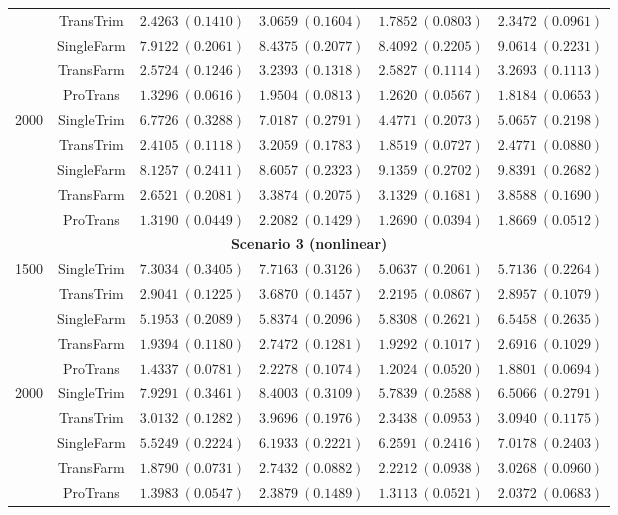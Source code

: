 \documentclass[12pt]{article}
\begin{document}
\begin{table}[!ht]
\begin{tabular}{cccccc}
& TransTrim   & $2.4263\ (0.1410)$ & $3.0659\ (0.1604)$ & $1.7852\ (0.0803)$ & $2.3472\ (0.0961)$ \\
& SingleFarm  & $7.9122\ (0.2061)$ & $8.4375\ (0.2077)$ & $8.4092\ (0.2205)$ & $9.0614\ (0.2231)$ \\
& TransFarm   & $2.5724\ (0.1246)$ & $3.2393\ (0.1318)$ & $2.5827\ (0.1114)$ & $3.2693\ (0.1113)$ \\
& ProTrans    & $\bm{1.3296}\ (0.0616)$ & $\bm{1.9504}\ (0.0813)$ & $\bm{1.2620}\ (0.0567)$ & $\bm{1.8184}\ (0.0653)$ \\
\hline
\multirow{5}{*}{2000}
& SingleTrim  & $6.7726\ (0.3288)$ & $7.0187\ (0.2791)$ & $4.4771\ (0.2073)$ & $5.0657\ (0.2198)$ \\
& TransTrim   & $2.4105\ (0.1118)$ & $3.2059\ (0.1783)$ & $1.8519\ (0.0727)$ & $2.4771\ (0.0880)$ \\
& SingleFarm  & $8.1257\ (0.2411)$ & $8.6057\ (0.2323)$ & $9.1359\ (0.2702)$ & $9.8391\ (0.2682)$ \\
& TransFarm   & $2.6521\ (0.2081)$ & $3.3874\ (0.2075)$ & $3.1329\ (0.1681)$ & $3.8588\ (0.1690)$ \\
& ProTrans    & $\bm{1.3190}\ (0.0449)$ & $\bm{2.2082}\ (0.1429)$ & $\bm{1.2690}\ (0.0394)$ & $\bm{1.8669}\ (0.0512)$ \\
        \hline
         \multicolumn{6}{c}{\textbf{Scenario 3 (nonlinear)}}\\
        \hline
        \multirow{5}{*}{1500}
& SingleTrim  & $7.3034\ (0.3405)$& $7.7163\ (0.3126)$& $5.0637\ (0.2061)$  & $5.7136\ (0.2264)$\\
& TransTrim   & $2.9041\ (0.1225)$  & $3.6870\ (0.1457)$ & $2.2195\ (0.0867)$  & $2.8957\ (0.1079)$  \\
& SingleFarm  & $5.1953\ (0.2089)$ & $5.8374\ (0.2096)$ & $5.8308\ (0.2621)$ & $6.5458\ (0.2635)$ \\
& TransFarm   & $1.9394\ (0.1180)$  & $2.7472\ (0.1281)$  & $1.9292\ (0.1017)$  & $2.6916\ (0.1029)$ \\
& ProTrans    & $\bm{1.4337}\ (0.0781)$ & $\bm{2.2278}\ (0.1074)$ & $\bm{1.2024}\ (0.0520)$  & $\bm{1.8801}\ (0.0694)$ \\
\hline
\multirow{5}{*}{2000}
& SingleTrim  & $7.9291\ (0.3461)$  & $8.4003\ (0.3109)$  & $5.7839\ (0.2588)$  & $6.5066\ (0.2791)$ \\
& TransTrim   & $3.0132\ (0.1282)$  & $3.9696\ (0.1976)$& $2.3438\ (0.0953)$ & $3.0940\ (0.1175)$  \\
& SingleFarm  & $5.5249\ (0.2224)$ & $6.1933\ (0.2221)$  & $6.2591\ (0.2416)$  & $7.0178\ (0.2403)$  \\
& TransFarm   & $1.8790\ (0.0731)$ & $2.7432\ (0.0882)$  & $2.2212\ (0.0938)$  & $3.0268\ (0.0960)$\\
& ProTrans    & $\bm{1.3983}\ (0.0547)$ & $\bm{2.3879}\ (0.1489)$ &$\bm{1.3113}\ (0.0521)$ & $\bm{2.0372}\ (0.0683)$ \\
        \bottomrule
    \end{tabular}
\end{table}
\end{document}
